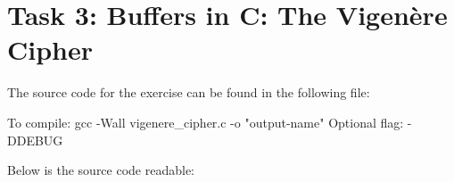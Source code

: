 \section{Task 3: Buffers in C: The Vigenère Cipher}


The source code for the exercise can be found in the following file: 

To compile: gcc -Wall vigenere\_cipher.c -o "output-name" Optional flag: -DDEBUG

Below is the source code readable:

